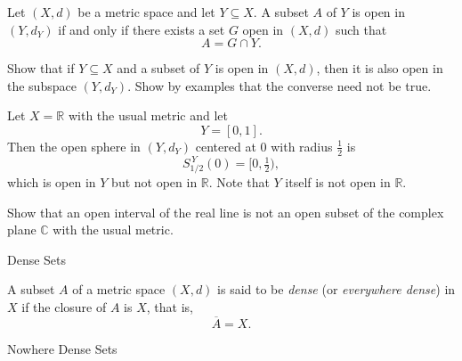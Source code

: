 \documentclass[12pt, a4paper]{article}
\begin{document}
\begin{theorem}
Let $(X,d)$ be a metric space and let $Y\subseteq X$. A subset $A$ of $Y$ is open in
$(Y,d_Y)$ if and only if there exists a set $G$ open in $(X,d)$ such that
\[
A = G \cap Y.
\]
\end{theorem}

\clearpage

\begin{theorem}
Show that if $Y\subseteq X$ and a subset of $Y$ is open in $(X,d)$, then it is also open in
the subspace $(Y,d_Y)$. Show by examples that the converse need not be true.
\end{theorem}

\vspace{20pt}

\begin{problem}
Let $X=\mathbb{R}$ with the usual metric and let
\[
Y=[0,1].
\]
Then the open sphere in $(Y,d_Y)$ centered at $0$ with radius $\tfrac12$ is
\[
S^{\,Y}_{1/2}(0)=[0,\tfrac12),
\]
which is open in $Y$ but not open in $\mathbb{R}$. Note that $Y$ itself is not open in
$\mathbb{R}$.
\end{problem}

\vspace{80pt}

\begin{problem}
Show that an open interval of the real line is not an open subset of the complex plane
$\mathbb{C}$ with the usual metric.
\end{problem}

\clearpage

\begin{heading}
    Dense Sets
\end{heading}

\vspace{10pt}

\begin{definition}
A subset $A$ of a metric space $(X,d)$ is said to be \emph{dense} (or \emph{everywhere dense})
in $X$ if the closure of $A$ is $X$, that is,
\[
\overline{A}=X.
\]
\end{definition}

\clearpage

\begin{heading}
    Nowhere Dense Sets
\end{heading}
\end{document}
